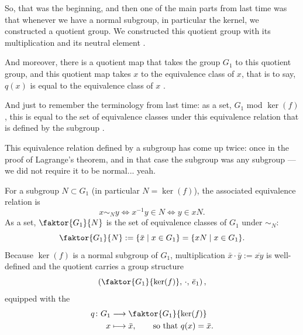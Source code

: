 \begin{speech}[00:01:18 - 00:02:39]
So, that was the beginning, and then one of the main parts from last time was that whenever we have a normal subgroup, in particular the kernel, we constructed a quotient group. We constructed this quotient group with its multiplication and its neutral element .

And moreover, there is a quotient map that takes the group $G_1$ to this quotient group, and this quotient map takes $x$ to the equivalence class of $x$, that is to say, $q(x)$ is equal to the equivalence class of $x$ .

And just to remember the terminology from last time: as a set, $G_1$ mod $\ker(f)$, this is equal to the set of equivalence classes under this equivalence relation that is defined by the subgroup .

This equivalence relation defined by a subgroup has come up twice: once in the proof of Lagrange's theorem, and in that case the subgroup was any subgroup --- we did not require it to be normal... yeah. 
\end{speech}

\begin{content}

For a subgroup $N \subset G_1$ (in particular $N = \ker(f)$), the associated equivalence relation is
\begin{equation}\label{eq:equiv-rel-subgroup}
x \sim_N y \iff x^{-1} y \in N \iff y \in xN.
\end{equation}
As a set, $\faktor{G_1}{N}$ is the set of equivalence classes of $G_1$ under $\sim_N$:
\begin{equation}\label{eq:quotient-set-def-w8wed}
\faktor{G_1}{N} := \{ \bar{x} \mid x \in G_1 \} = \{ xN \mid x \in G_1 \}.
\end{equation}
Because $\ker(f)$ is a normal subgroup of $G_1$, multiplication $\bar{x} \cdot \bar{y} := \overline{xy}$ is well-defined and the quotient carries a group structure
\[
\left( \faktor{G_1}{\ker(f)}, \, \cdot, \, \bar{e}_1 \right),
\]
equipped with the 
\begin{align}
q \colon G_1 &\longrightarrow \faktor{G_1}{\ker(f)} \label{eq:quotient-map-canonical} \\
x &\longmapsto \bar{x}, \qquad \text{so that } q(x) = \bar{x}. \nonumber
\end{align}
\end{content}


